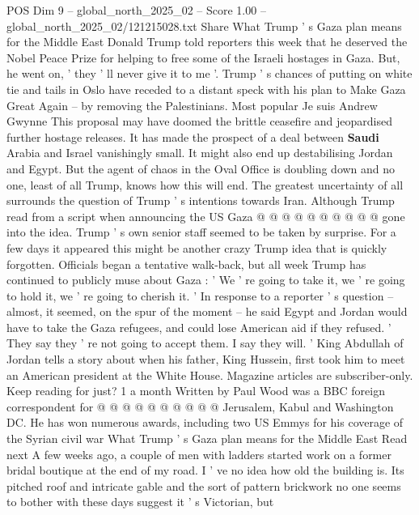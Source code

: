 \begin{textsample}{POS Dim 9 – global\_north\_2025\_02 – Score 1.00 – global\_north\_2025\_02/121215028.txt}  \label{ex:f9_pos_391}
Share What Trump ' s Gaza plan means for the Middle East Donald Trump told reporters this week that he deserved the Nobel Peace Prize for helping to free some of the Israeli hostages in Gaza.
But, he went on, ' they ' ll never give it to me '.
Trump ' s chances of putting on white tie and tails in Oslo have receded to a distant speck with his plan to Make Gaza Great Again -- by removing the Palestinians.
Most popular Je suis Andrew Gwynne This proposal may have doomed the brittle ceasefire and jeopardised further hostage releases.
It has made the prospect of a deal between \textbf{Saudi} Arabia and Israel vanishingly small.
It might also end up destabilising Jordan and Egypt.
But the agent of chaos in the Oval Office is doubling down and no one, least of all Trump, knows how this will end.
The greatest uncertainty of all surrounds the question of Trump ' s intentions towards Iran.
Although Trump read from a script when announcing the US Gaza @ @ @ @ @ @ @ @ @ @ gone into the idea.
Trump ' s own senior staff seemed to be taken by surprise.
For a few days it appeared this might be another crazy Trump idea that is quickly forgotten.
Officials began a tentative walk-back, but all week Trump has continued to publicly muse about Gaza : ' We ' re going to take it, we ' re going to hold it, we ' re going to cherish it. ' In response to a reporter ' s question -- almost, it seemed, on the spur of the moment -- he said Egypt and Jordan would have to take the Gaza refugees, and could lose American aid if they refused. ' They say they ' re not going to accept them.
I say they will. ' King Abdullah of Jordan tells a story about when his father, King Hussein, first took him to meet an American president at the White House.
Magazine articles are subscriber-only.
Keep reading for just? 1 a month Written by Paul Wood was a BBC foreign correspondent for @ @ @ @ @ @ @ @ @ @ Jerusalem, Kabul and Washington DC.
He has won numerous awards, including two US Emmys for his coverage of the Syrian civil war What Trump ' s Gaza plan means for the Middle East Read next A few weeks ago, a couple of men with ladders started work on a former bridal boutique at the end of my road.
I ' ve no idea how old the building is.
Its pitched roof and intricate gable and the sort of pattern brickwork no one seems to bother with these days suggest it ' s Victorian, but

\end{textsample}
